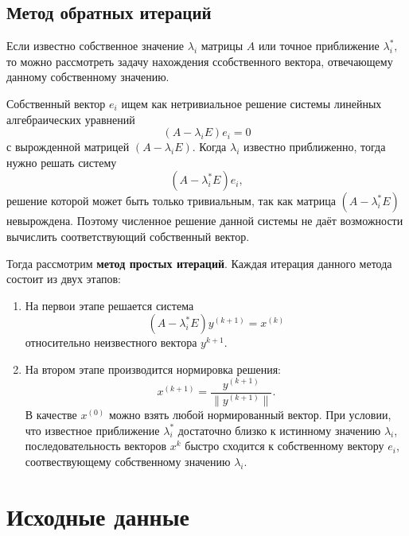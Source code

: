 \documentclass[12pt, a4paper]{article}
\begin{document}
    \subsection{Метод обратных итераций}

    Если известно собственное значение $\lambda_{i}$ матрицы $A$ или точное приближение $\lambda_{i}^{*},$ то можно рассмотреть задачу нахождения ссобственного вектора, отвечающему данному собственному значению.

    Собственный вектор $e_{i}$ ищем как нетривиальное решение системы линейных алгебраических уравнений
    \[
        (A-\lambda_{i}E)e_{i}=0
    \]
    с вырожденной матрицей $(A-\lambda_{i}E)$. Когда $\lambda_{i}$ известно приближенно, тогда нужно решать систему
    \[
        (A-\lambda_{i}^{*}E)e_{i},
    \]
    решение которой может быть только тривиальным, так как матрица $(A-\lambda_{i}^{*}E)$ невырождена. Поэтому численное решение данной системы не даёт возможности вычислить соответствующий собственный вектор.

    Тогда рассмотрим \textbf{метод простых итераций}. Каждая итерация данного метода состоит из двух этапов:

    \begin{enumerate}
        \item На первои этапе решается система 
        \[
            (A-\lambda_{i}^{*}E)y^{(k+1)}=x^{(k)}
        \]
        относительно неизвестного вектора $y^{k+1}$.

        \item На втором этапе производится нормировка решения:
        \[
            x^{(k+1)}=\frac{y^{(k+1)}}{\|y^{(k+1)}\|}. 
        \]
        В качестве $x^{(0)}$ можно взять любой нормированный вектор. При условии, что известное приближение $\lambda_{i}^{*}$ достаточно близко к истинному значению $\lambda_{i}$, последовательность векторов $x^{k}$ быстро сходится к собственному вектору $e_{i}$, соотвествующему собственному значению $\lambda_{i}$.
    \end{enumerate}

    \newpage

    \section{Исходные данные}
\end{document}
